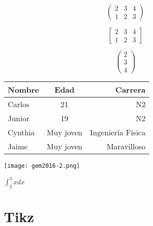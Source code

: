 \documentclass[a4paper,12pt]{article}
\theoremstyle{theorem}
\theoremstyle{definition}
\begin{document}
\[
	\begin{pmatrix}
	2 & 3 & 4 \\ 
	1 & 2 & 3
	\end{pmatrix}
\]

\[
	\begin{bmatrix}
	2 & 3 & 4 \\ 
	1 & 2 & 3
	\end{bmatrix}
\]

\[
	\begin{pmatrix}
	2 \\
	3 \\
	4 
	\end{pmatrix}
\]

\begin{tabular}{||l|c|r||}
	\hline Nombre & Edad & Carrera \\ 
	\hline Carlos & 21 & N2 \\ 
	\hline Junior & 19 & N2 \\ 
	\hline Cynthia & Muy joven & Ingeniería Física \\ 
	\hline Jaime & Muy joven & Maravilloso \\ 
	\hline\hline
\end{tabular} 
 
\begin{center}
	\texttt{[image: gem2016-2.png]}
\end{center}
\( {\int }_{2}^{3}xdx \) 

\section{Tikz}

\end{document}
